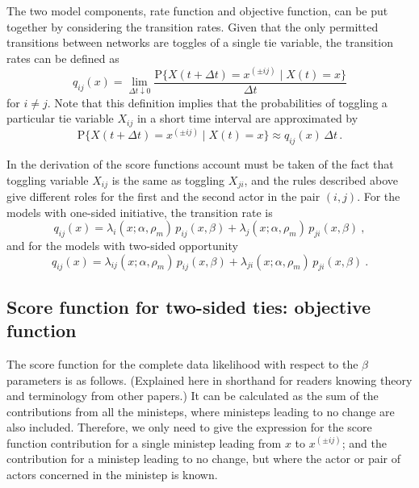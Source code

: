 \documentclass[a4paper,12pt,fleqn]{article}
\renewcommand{\P}{\mbox{P}}
\begin{document}
The two model components, rate function and objective function,
can be put together by considering the transition rates.
Given that the only permitted transitions between networks are toggles of
a single tie variable, the transition rates can be defined as
\begin{equation}
  q_{ij}(x) = \lim_{\Delta t \downarrow 0}
         \frac{\P \{ X(t + \Delta t) = x^{(\pm ij)} \mid X(t) = x \}}
                                                {\Delta t}
\end{equation}
for $i \neq j$.
Note that this definition implies that the probabilities of toggling
a particular tie variable $X_{ij}$ in a short time interval
are approximated by
\[
  \P \{ X(t + \Delta t) = x^{(\pm ij)} \mid X(t) = x \} \approx
    q_{ij}(x)\, \Delta t\,  .
\]

In the derivation of the score functions
account must be taken of the fact that
toggling variable $X_{ij}$ is the same as toggling $X_{ji}$,
and the rules described above give different roles
for the first and the second actor in the pair $(i,j )$.
For the models with one-sided initiative, the transition rate is
\begin{equation}
  q_{ij}(x) = \lambda_i(x; \alpha, \rho_m)\,p_{ij}(x, \beta) +
              \lambda_j(x; \alpha, \rho_m)\,p_{ji}(x, \beta) \ , \label{q1}
\end{equation}
and for the models with two-sided opportunity
\begin{equation}
  q_{ij}(x) = \lambda_{ij}(x; \alpha, \rho_m)\,p_{ij}(x, \beta) +
              \lambda_{ji}(x; \alpha, \rho_m)\,p_{ji}(x, \beta) \ . \label{q2}
\end{equation}



\subsection{Score function for two-sided ties: objective function}
The score function for the complete data likelihood with respect to the
$\beta$ parameters is as follows. (Explained here in shorthand for readers
knowing theory and terminology from other papers.) It can be calculated as
the sum of the contributions from all the ministeps, where ministeps leading
to no change are also included. Therefore, we only need to give the
expression for the score function contribution for a single ministep leading
from $x$ to $x^{( \pm ij)}$; and the contribution for a ministep leading to
no change, but where the actor or pair of actors concerned in the ministep is
known.
\end{document}

